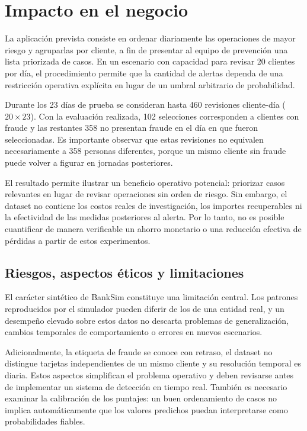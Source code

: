 \section{Impacto en el negocio}

La aplicación prevista consiste en ordenar diariamente las operaciones de mayor riesgo y agruparlas por cliente, a fin de presentar al equipo de prevención una lista priorizada de casos. En un escenario con capacidad para revisar 20 clientes por día, el procedimiento permite que la cantidad de alertas dependa de una restricción operativa explícita en lugar de un umbral arbitrario de probabilidad.

Durante los 23 días de prueba se consideran hasta 460 revisiones cliente-día ($20\times23$). Con la evaluación realizada, 102 selecciones corresponden a clientes con fraude y las restantes 358 no presentan fraude en el día en que fueron seleccionadas. Es importante observar que estas revisiones no equivalen necesariamente a 358 personas diferentes, porque un mismo cliente sin fraude puede volver a figurar en jornadas posteriores.

El resultado permite ilustrar un beneficio operativo potencial: priorizar casos relevantes en lugar de revisar operaciones sin orden de riesgo. Sin embargo, el dataset no contiene los costos reales de investigación, los importes recuperables ni la efectividad de las medidas posteriores al alerta. Por lo tanto, no es posible cuantificar de manera verificable un ahorro monetario o una reducción efectiva de pérdidas a partir de estos experimentos.

\subsection{Riesgos, aspectos éticos y limitaciones}
El carácter sintético de BankSim constituye una limitación central. Los patrones reproducidos por el simulador pueden diferir de los de una entidad real, y un desempeño elevado sobre estos datos no descarta problemas de generalización, cambios temporales de comportamiento o errores en nuevos escenarios.

Adicionalmente, la etiqueta de fraude se conoce con retraso, el dataset no distingue tarjetas independientes de un mismo cliente y su resolución temporal es diaria. Estos aspectos simplifican el problema operativo y deben revisarse antes de implementar un sistema de detección en tiempo real. También es necesario examinar la calibración de los puntajes: un buen ordenamiento de casos no implica automáticamente que los valores predichos puedan interpretarse como probabilidades fiables.

